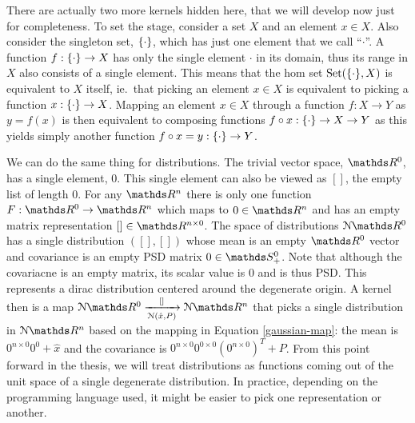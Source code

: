 There are actually two more kernels hidden here, that we will develop now just for completeness. To set the stage, consider a set $X$ and an element $x\in X$. Also consider the singleton set, $\{\cdot\}$, which has just one element that we call ``$\cdot$''. A function $f:\{\cdot\}\rightarrow X$ has only the single element $\cdot$ in its domain, thus its range in $X$ also consists of a single element. This means that the hom set $\mathrm{Set}(\{\cdot\}, X)$ is equivalent to $X$ itself, ie.\ that picking an element $x\in X$ is equivalent to picking a function $x:\{\cdot\} \rightarrow X$. Mapping an element $x\in X$ through a function $f:X\rightarrow Y$ as $y=f(x)$ is then equivalent to composing functions $f\circ x:\{\cdot\}\rightarrow X\rightarrow Y$ as this yields simply another function $f\circ x = y :\{\cdot\}\rightarrow Y$.

We can do the same thing for distributions. The trivial vector space, $\reals^0$, has a single element, $0$. This single element can also be viewed as $[]$, the empty list of length 0. For any $\reals^n$ there is only one function $F:\reals^0\rightarrow \reals^n$ which maps to $0\in\reals^n$ and has an empty matrix representation $[]\in \reals^{n\times 0}$. The space of distributions $\gaussian \reals^0$ has a single distribution $([], [])$ whose mean is an empty $\reals^0$ vector and covariance is an empty PSD matrix $0\in\symmetric^0_+$. Note that although the covariacne is an empty matrix, its scalar value is 0 and is thus PSD. This represents a dirac distribution centered around the degenerate origin. A kernel then is a map $\gaussian \reals^0 \xrightarrow[\gaussian(\hat{x},P)]{[]}\gaussian \reals^n$ that picks a single distribution in $\gaussian\reals^n$ based on the mapping in Equation \ref{gaussian-map}: the mean is $0^{n\times 0}0^0 + \hat{x}$ and the covariance is $0^{n\times 0}0^{0\times 0}(0^{n\times 0})^T + P$. From this point forward in the thesis, we will treat distributions as functions coming out of the unit space of a single degenerate distribution. In practice, depending on the programming language used, it might be easier to pick one representation or another.

